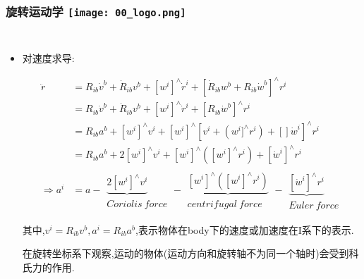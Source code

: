 \begin{frame}
  \frametitle{旋转运动学 \hfill \texttt{[image: 00\_logo.png]}}
  \begin{columns}
    
    \begin{itemize}
      \item 对速度求导:
  
      \begin{equation}
        \begin{split}
          \ddot{r} &= R_{ib} \dot{v}^b + \dot{R}_{ib} v^b +  [w^i]^\land \dot{r}^i + [\dot{R}_{ib} w^b + R_{ib}\dot{w}^b]^\land r^i  \\ 
          &= R_{ib}\dot{v}^b + \dot{R}_{ib} v^b + [w^i]^\land \dot{r}^i +  [R_{ib}\dot{w}^b]^\land r^i  \\ 
          &= R_{ib} a^b + [w^i]^\land v^i + [w^i]^\land[v^i+(w^i]^\land r^i) + []\dot{w}^i]^\land r^i \\ 
          &= R_{ib} a^b + 2[w^i]^\land v^i + [w^i]^\land([w^i]^\land r^i) + [\dot{w}^i]^\land r^i \\
          \Rightarrow a^i &= a - \begin{matrix}
          \underbrace{2[w^i]^\land v^i}\\ Coriolis \ force
        \end{matrix} - \begin{matrix}
          \underbrace{[w^i]^\land([w^i]^\land r^i)}\\ centrifugal \ force
        \end{matrix} - \begin{matrix}
          \underbrace{[\dot{w}^i]^\land r^i}\\ Euler \ force 
        \end{matrix}
        \end{split}
      \end{equation}
  
      其中,$v^i = R_{ib}v^b, a^i = R_{ib}a^b$,表示物体在body下的速度或加速度在I系下的表示.

      
  
      {\color{red}在旋转坐标系下观察,运动的物体(运动方向和旋转轴不为同一个轴时)会受到科氏力的作用.}
    \end{itemize}
    
  
  \end{columns}
  \end{frame}      
  
  



